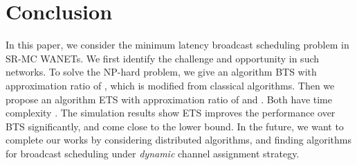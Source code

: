 \documentclass[10pt, conference]{IEEEtran}
\begin{document}
\fi









\iffalse
In our simulations, we compare our BTS and ETS algorithms with
a modified existing greedy algorithm (GA) proposed by \cite{ICDCN10,
MR-MC}. The greedy algorithm first constructs a BFS tree. After
that, GA runs in layers and selects a tx instance (including node and channel)
 which covers the maximum number of uncovered nodes in
each layer. GA also calculates the rank of each node. For a
node, a high rank means it is responsible for relaying packets
further.
\fi


















\section{Conclusion} \label{con}
In this paper, we consider the minimum latency broadcast
scheduling problem in SR-MC WANETs. We first identify the
challenge and opportunity in such networks. To solve the
NP-hard problem, we give an algorithm BTS with approximation
ratio of , which is modified from classical
algorithms. Then we propose an algorithm ETS with approximation
ratio of and . Both have time complexity . The
simulation results show ETS improves the performance over BTS
significantly, and come close to the lower bound. In the
future, we want to complete our works by considering
distributed algorithms, and finding algorithms for broadcast
scheduling under \emph{dynamic} channel assignment strategy.




\iffalse
\section{Future Work}
The future work includes:
\begin{itemize}
  \item Distributed Algorithms and Performance Bound.
  \item Channel-Hopping Based Algorithms.
\end{itemize}
\fi
\end{document}
